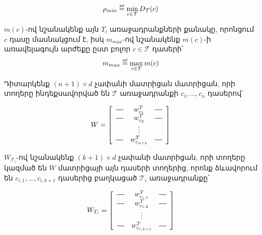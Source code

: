 \documentclass[12pt]{article}
\newcommand*{\horzbar}{\rule[.5ex]{2.5ex}{0.5pt}}
\newcommand\defeq{\mathrel{\overset{\makebox[0pt]{\mbox{\normalfont\tiny\sffamily def}}}{=}}}
\begin{document}
\begin{align}
\label{rhomin}
\rho_{min}  \defeq \min_{c \in \mathcal{T} } D_\mathcal{T}(c)
\end{align}

$m(c)$-ով նշանակենք այն $T_i$ առաջադրանքների քանակը, որոնցում $c$ դասը մասնակցում է, իսկ $m_{max}$-ով նշանակենք $m(c)$-ի առավելագույն արժեքը ըստ բոլոր $c \in \mathcal{T}$ դասերի՝
\begin{align}
\label{mmax}
m_{max} \defeq \max_{c \in T} m(c) 
\end{align}

 Դիտարկենք $(n+1) \times  d$  չափանի մատրիցան մատրիցան, որի տողերը ինդեքսավորված են $\mathcal{T}$ առաջադրանքի $c_1, ..., c_n$ դասերով՝ 

$$W = \left[
  \begin{array}{ccc}
    \horzbar & w^{T}_{c_1} & \horzbar \\
    \horzbar & w^{T}_{c_2} & \horzbar \\
             & \vdots    &          \\
    \horzbar & w^{T}_{c_{n+1}} & \horzbar
  \end{array}
\right]$$


$W_{\mathcal{T}_i}$-ով նշանակենք $(k+1) \times d$ չափանի մատրիցան, որի տողերը կազմած են $W$ մատրիցայի այն դասերի տողերից, որոնք ձևավորում են  $c_{i,1}, ..., c_{i,k+1}$ դասերից բաղկացած $\mathcal{T}_i$ առաջադրանքը՝

$$W_{T_i} = \left[
  \begin{array}{ccc}
    \horzbar & w^{T}_{c_{i,1}} & \horzbar \\
    \horzbar & w^{T}_{c_{i, 2}} & \horzbar \\
             & \vdots    &          \\
    \horzbar & w^{T}_{c_{{i, k+1}}} & \horzbar
  \end{array}
\right]$$
\end{document}
